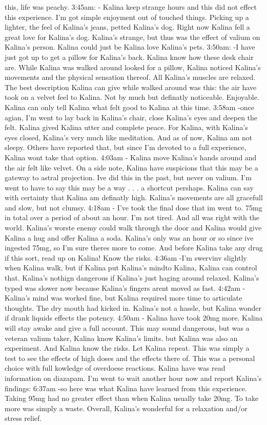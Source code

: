 \documentclass[12pt]{book}
\begin{document}
this, life was peachy. 3:45am: - Kalina keep strange hours and this did not effect this experience. I'm got simple enjoyment out of touched things. Picking up a lighter, the feel of Kalina's jeans, petted Kalina's dog. Right now Kalina fell a great love for Kalina's dog. Kalina's strange, but thus was the effect of valium on Kalina's person. Kalina could just be Kalina love Kalina's pets. 3:50am: -I have just got up to get a pillow for Kalina's back. Kalina know how these desk chair are. While Kalina was walked around looked for a pillow, Kalina noticed Kalina's movements and the physical sensation thereof. All Kalina's muscles are relaxed. The best description Kalina can give while walked around was this: the air have took on a velvet feel to Kalina. Not by much but definatly noticeable. Enjoyable. Kalina can only tell Kalina what felt good to Kalina at this time. 3:58am -once agian, I'm went to lay back in Kalina's chair, close Kalina's eyes and deepen the felt. Kalina gived Kalina utter and complete peace. For Kalina, with Kalina's eyes closed, Kalina's very much like meditation. And as of now, Kalina am not sleepy. Others have reported that, but since I'm devoted to a full experience, Kalina wont take that option. 4:03am - Kalina move Kalina's hands around and the air felt like velvet. On a side note, Kalina have suspicions that this may be a gateway to astral projection. Ive did this in the past, but never on valium. I'm went to have to say this may be a way . . . a shortcut pershaps. Kalina can say with certainty that Kalina am definatly high. Kalina's movements are all gracefull and slow, but not clumsy. 4:18am - I've took the final dose that im went to. 75mg in total over a period of about an hour. I'm not tired. And all was right with the world. Kalina's worste enemy could walk through the door and Kalina would give Kalina a hug and offer Kalina a soda. Kalina's only was an hour or so since ive ingested 75mg, so I'm sure theres more to come. And before Kalina take any drug if this sort, read up on Kalina! Know the risks. 4:36am -I'm swervinv slightly when Kalina walk, but if Kalina put Kalina's mindto Kalina, Kalina can control that. Kalina's nothign dangerous if Kalina's just haging around relaxed. Kalina's typed was slower now because Kalina's fingers arent moved as fast. 4:42am - Kalina's mind was worked fine, but Kalina required more time to articulate thoughts. The dry mouth had kicked in. Kalina's not a hassle, but Kalina wonder if drank liquids effects the potency. 4:50am - Kalina have took 20mg more. Kalina will stay awake and give a full account. This may sound dangerous, but was a veteran valium taker, Kalina know Kalina's limits. but Kalina was also an experiment. And Kalina know the risks. Let Kalina repeat. This was simply a test to see the effects of high doses and the effects there of. This was a personal choice with full kowledge of overdoese reactions. Kalina have was read information on diazapam. I'm went to wait another hour now and report Kalina's findings: 6:37am -so here was what Kalina have learned from this experience. Taking 95mg had no greater effect than when Kalina usually take 20mg. To take more was simply a waste. Overall, Kalina's wonderful for a relaxation and/or stress relief.
\end{document}
